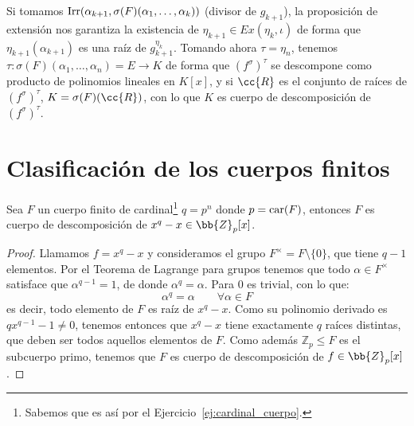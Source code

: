 \begin{ejercicio}
\begin{figure}[H]
    \end{figure}
    Si tomamos $\operatorname{Irr}(\alpha_{k+1},\sigma(F)(\alpha_1, \ldots, \alpha_k))$ (divisor de $g_{k+1}$), la proposición de extensión nos garantiza la existencia de $\eta_{k+1}\in Ex(\eta_k,\iota)$ de forma que $\eta_{k+1}(\alpha_{k+1})$ es una raíz de $g_{k+1}^{\eta_k}$. Tomando ahora $\tau = \eta_{n}$, tenemos $\tau:\sigma(F)(\alpha_1, \ldots, \alpha_n) = E\to K$ de forma que ${(f^{\sigma})}^{\tau}$ se descompone como producto de polinomios lineales en $K[x]$, y si $\cc{R}$ es el conjunto de raíces de ${(f^{\sigma})}^{\tau}$, $K = \sigma(F)(\cc{R})$, con lo que $K$ es cuerpo de descomposición de ${(f^{\sigma})}^{\tau}$.
\end{ejercicio}

\section{Clasificación de los cuerpos finitos} 
\begin{prop}\label{prop:cuerpo_descomposicion}
    Sea $F$ un cuerpo finito de cardinal\footnote{Sabemos que es así por el Ejercicio~\ref{ej:cardinal_cuerpo}.} $q=p^n$  donde $p=\operatorname{car}(F)$, entonces $F$ es cuerpo de descomposición de $x^q-x\in \bb{Z}_p[x]$.
    \begin{proof}
        Llamamos $f=x^q-x$ y consideramos el grupo $F^{\times} = F\setminus\{0\}$, que tiene $q-1$ elementos. Por el Teorema de Lagrange para grupos tenemos que todo $\alpha\in F^{\times}$ satisface que $\alpha^{q-1}=1$, de donde $\alpha^q = \alpha$. Para $0$ es trivial, con lo que:
        \begin{equation*}
            \alpha^q = \alpha \qquad \forall \alpha\in F
        \end{equation*}
        es decir, todo elemento de $F$ es raíz de $x^q-x$. Como su polinomio derivado es $qx^{q-1}-1 \neq 0$, tenemos entonces que $x^q-x$ tiene exactamente $q$ raíces distintas, que deben ser todos aquellos elementos de $F$. Como además $\mathbb{Z}_p\leq F$ es el subcuerpo primo, tenemos que $F$ es cuerpo de descomposición de $f\in \bb{Z}_p[x]$.
    \end{proof}
\end{prop}

